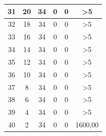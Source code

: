\begin{longtable}{|c|c|c|c|c|c|}
	31                                           & 20                     & 34                    & 0                     & 0                      & >5                                              \\ \hline
	32                                           & 18                     & 34                    & 0                     & 0                      & >5                                              \\ \hline
	33                                           & 16                     & 34                    & 0                     & 0                      & >5                                            \\ \hline
	34                                           & 14                     & 34                    & 0                     & 0                      & >5                                             \\ \hline
	35                                           & 12                     & 34                    & 0                     & 0                      & >5                                             \\ \hline
	36                                           & 10                     & 34                    & 0                     & 0                      & >5                                             \\ \hline
	37                                           & 8                      & 34                    & 0                     & 0                      & >5                                            \\ \hline
	38                                           & 6                      & 34                    & 0                     & 0                      & >5                                             \\ \hline
	39                                           & 4                      & 34                    & 0                     & 0                      & >5                                             \\ \hline
	40                                           & 2                      & 34                    & 0                     & 0                      & 1600,00                                            \\ \hline	
\end{longtable}

